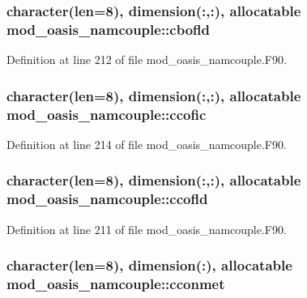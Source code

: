 \hypertarget{classmod__oasis__namcouple_ab0f93bb917e445dc4e55fc2326168a42}{
\subsubsection[{cbofld}]{\setlength{\rightskip}{0pt plus 5cm}character(len=8), dimension(\+:,\+:), allocatable mod\+\_\+oasis\+\_\+namcouple\+::cbofld\hspace{0.3cm}{\ttfamily [private]}}}\label{classmod__oasis__namcouple_ab0f93bb917e445dc4e55fc2326168a42}


Definition at line 212 of file mod\+\_\+oasis\+\_\+namcouple.\+F90.

\hypertarget{classmod__oasis__namcouple_a009543dda4495ab9b5ac3fcf15767682}{
\subsubsection[{ccofic}]{\setlength{\rightskip}{0pt plus 5cm}character(len=8), dimension(\+:,\+:), allocatable mod\+\_\+oasis\+\_\+namcouple\+::ccofic\hspace{0.3cm}{\ttfamily [private]}}}\label{classmod__oasis__namcouple_a009543dda4495ab9b5ac3fcf15767682}


Definition at line 214 of file mod\+\_\+oasis\+\_\+namcouple.\+F90.

\hypertarget{classmod__oasis__namcouple_af8d81a53bd28ddf6bfe19f5e05f1d867}{
\subsubsection[{ccofld}]{\setlength{\rightskip}{0pt plus 5cm}character(len=8), dimension(\+:,\+:), allocatable mod\+\_\+oasis\+\_\+namcouple\+::ccofld\hspace{0.3cm}{\ttfamily [private]}}}\label{classmod__oasis__namcouple_af8d81a53bd28ddf6bfe19f5e05f1d867}


Definition at line 211 of file mod\+\_\+oasis\+\_\+namcouple.\+F90.

\hypertarget{classmod__oasis__namcouple_a535fadd17426c228698e3a51fd54b605}{
\subsubsection[{cconmet}]{\setlength{\rightskip}{0pt plus 5cm}character(len=8), dimension(\+:), allocatable mod\+\_\+oasis\+\_\+namcouple\+::cconmet\hspace{0.3cm}{\ttfamily [private]}}}\label{classmod__oasis__namcouple_a535fadd17426c228698e3a51fd54b605}


